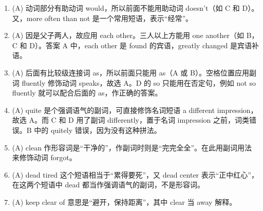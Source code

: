 \documentclass{yufa}
\begin{document}
\begin{enumerate}
\item (A) 动词部分有助动词 would，所以前面不能用助动词 doesn't（如 C 和 D）。又，more often than not 是一个常用短语，表示“经常”。
\item (A) 因是父子两人，故应用 each other。三人以上方能用 one another（如 B，C
  和 D）。答案 A 中，each other 是 found 的宾语，greatly changed 是宾语补语。
\item (A) 后面有比较级连接词 as，所以前面只能用 as（A 或 B）。空格位置应用副词 fluently 修饰动词 speaks，故选 A。D 的 so 只能用在否定句，例如 not so fluently 就可以配合后面的 as，作正确的答案。
\item (A) quite 是个强调语气的副词，可直接修饰名词短语 a different impression，故选 A。而 C 和 D 用了副词 differently，置于名词 impression 之前，词类错误。B 中的 quitely 错误，因为没有这种拼法。
\item (A) clean 作形容词是“干净的”，作副词时则是“完完全全”。在此用副词用法来修饰动词 forgot。
\item (A) dead tired 这个短语相当于“累得要死”，又 dead center 表示“正中红心”，在这两个短语中 dead 都当作强调语气的副词，不是形容词。
\item (A) keep clear of 意思是“避开，保持距离”，其中 clear 当 away 解释。


\end{enumerate}
\end{document}
